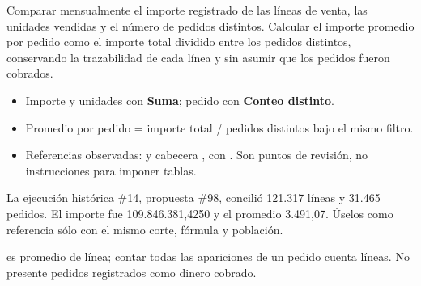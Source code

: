 \label{aw01}
\begin{goal}
Comparar mensualmente el importe registrado de las líneas de venta, las unidades vendidas y el número de pedidos distintos. Calcular el importe promedio por pedido como el importe total dividido entre los pedidos distintos, conservando la trazabilidad de cada línea y sin asumir que los pedidos fueron cobrados.
\end{goal}
\begin{itemize}
\item Importe y unidades con \textbf{Suma}; pedido con \textbf{Conteo distinto}.
\item Promedio por pedido = importe total / pedidos distintos bajo el mismo filtro.
\item Referencias observadas:  y cabecera , con . Son puntos de revisión, no instrucciones para imponer tablas.
\end{itemize}
\begin{good}
La ejecución histórica \#14, propuesta \#98, concilió 121.317 líneas y 31.465 pedidos. El importe fue 109.846.381,4250 y el promedio 3.491,07. Úselos como referencia sólo con el mismo corte, fórmula y población.
\end{good}
\begin{note}
 es promedio de línea; contar todas las apariciones de un pedido cuenta líneas. No presente pedidos registrados como dinero cobrado.
\end{note}

